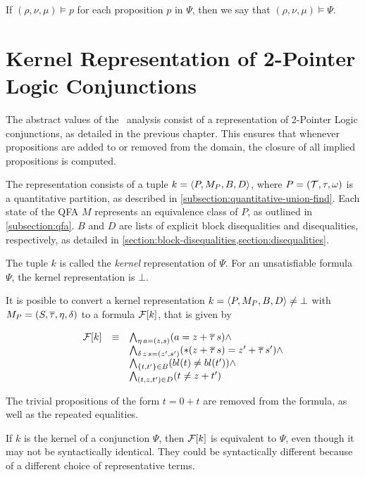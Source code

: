 If $(\rho, \nu, \mu)\models p$ for each proposition $p$ in $\Psi$, then we say that $(\rho, \nu, \mu) \models \Psi$.





\section{Kernel Representation of 2-Pointer Logic Conjunctions}
The abstract values of the \cpo\ analysis consist of a representation
of 2-Pointer Logic conjunctions, as detailed in the previous chapter.
This ensures that whenever propositions are added to or removed from the domain,
the closure of all implied propositions is computed.

The representation consists of a tuple $k = \langle P,M_P,B,D\rangle$,
where $P = (\mathcal{T}, \tau, \omega)$ is a quantitative partition, as described in \cref{subsection:quantitative-union-find}.
Each state of the QFA $M$ represents an equivalence class of $P$, as outlined in \cref{subsection:qfa}.
$B$ and $D$ are lists of explicit block disequalities and disequalities, respectively, as detailed in \cref{section:block-disequalities,section:disequalities}.

The tuple $k$ is called the \emph{kernel} representation of $\Psi$.
For an unsatisfiable formula $\Psi$, the kernel representation is $\bot$.

It is posible to convert a kernel representation $k = \langle P,M_P,B,D\rangle \neq \bot$ with $M_P = (S, \overline{\tau}, \eta, \delta)$ to a formula $\mathcal{F}[k]$, that is given by

\[
  \begin{array}{lll}
    \mathcal{F}[k] & \equiv & \bigwedge_{\eta\,a=(z,s)} (a = z + \overline{\tau}\,s) \land                        \\
          &        & \bigwedge_{\delta\,z\,s=(z',s')} (*(z + \overline{\tau}\,s) = z' + \overline{\tau}\,s') \land \\
          &        & \bigwedge_{\{t, t'\} \in B} (bl(t) \neq bl(t')) \land                     \\
          &        & \bigwedge_{(t, z, t') \in D} (t \neq z + t')
  \end{array}
\]

The trivial propositions of the form $t = 0 + t$ are removed from the formula, as well as the repeated equalities.

If $k$ is the kernel of a conjunction $\Psi$, then $\mathcal{F}[k]$ is equivalent to $\Psi$,
even though it may not be syntactically identical.
They could be syntactically different because of a different choice of representative terms.



